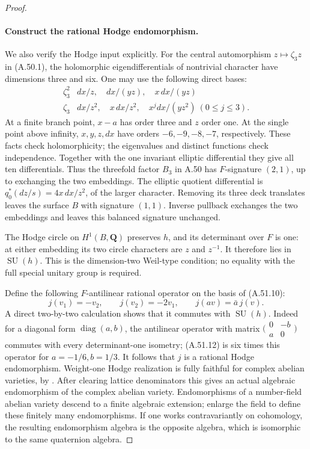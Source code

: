 \begin{proof}
\paragraph{Construct the rational Hodge endomorphism.}
We also verify the Hodge input explicitly.
For the central automorphism \(z\mapsto\zeta_3z\)
in (A.50.1), the holomorphic eigendifferentials
of nontrivial character have dimensions three
and six. One may use the following direct bases:
\[
\begin{array}{c|l}
\zeta_3^2&dx/z,\quad dx/(yz),\quad x\,dx/(yz)\\
\zeta_3&dx/z^2,\quad x\,dx/z^2,
      \quad x^jdx/(yz^2)\ (0\le j\le3).
\end{array}                                                     \tag{A.51.11}
\]
At a finite branch point, \(x-a\) has order
three and \(z\) order one. At the single point
above infinity, \(x,y,z,dx\) have orders
\(-6,-9,-8,-7\), respectively. These facts
check holomorphicity; the eigenvalues and distinct
functions check independence. Together with the
one invariant elliptic differential they give
all ten differentials. Thus the threefold factor
\(B_3\) in A.50 has \(F\)-signature \((2,1)\),
up to exchanging the two embeddings. The elliptic
quotient differential is
\(q_0^*(dz/s)=4x\,dx/z^2\), of the larger
character. Removing its three deck translates
leaves the surface \(B\) with signature \((1,1)\).
Inverse pullback exchanges the two embeddings
and leaves this balanced signature unchanged.

The Hodge circle on \(H^1(B,\mathbf Q)\)
preserves \(h\), and its determinant over
\(F\) is one: at either embedding its two
circle characters are \(z\) and \(z^{-1}\).
It therefore lies in \(\operatorname{SU}(h)\).
This is the dimension-two Weil-type condition;
no equality with the full special unitary group
is required.

Define the following \(F\)-antilinear rational
operator on the basis of (A.51.10):
\[
                  j(v_1)=-v_2,\qquad j(v_2)=-2v_1,
                      \qquad j(av)=\bar a\,j(v).
                                                               \tag{A.51.12}
\]
A direct two-by-two calculation shows that it
commutes with \(\operatorname{SU}(h)\).
Indeed for a diagonal form \(\operatorname{diag}(a,b)\),
the antilinear operator with matrix
\(\bigl(\begin{smallmatrix}0&-b\\a&0\end{smallmatrix}\bigr)\)
commutes with every determinant-one isometry;
(A.51.12) is six times this operator for
\(a=-1/6,b=1/3\).
It follows that \(j\) is a rational Hodge
endomorphism. Weight-one Hodge realization is
fully faithful for complex abelian varieties,
by \cite[Theorems 4.4 and 7.12, pp.~489 and 508]{fghMilneSVModuli}.
After clearing lattice denominators this gives
an actual algebraic endomorphism of the complex
abelian variety. Endomorphisms of a number-field
abelian variety descend to a finite algebraic
extension; enlarge the field to define these
finitely many endomorphisms. If one works
contravariantly on cohomology, the resulting
endomorphism algebra is the opposite algebra,
which is isomorphic to the same quaternion algebra.


\end{proof}
